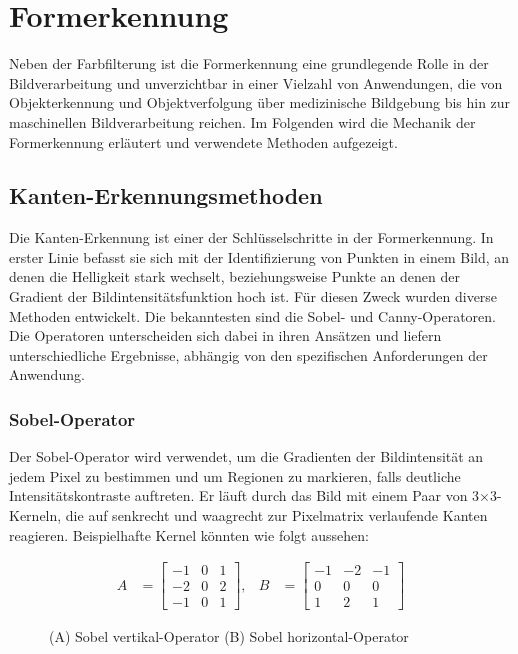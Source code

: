 \section{Formerkennung}
Neben der Farbfilterung ist die Formerkennung eine grundlegende Rolle in der Bildverarbeitung und unverzichtbar in einer Vielzahl von Anwendungen,
die von Objekterkennung und Objektverfolgung über medizinische Bildgebung bis hin zur maschinellen Bildverarbeitung reichen. Im Folgenden wird 
die Mechanik der Formerkennung erläutert und verwendete Methoden aufgezeigt.

\subsection{Kanten-Erkennungsmethoden}
Die Kanten-Erkennung ist einer der Schlüsselschritte in der Formerkennung. In erster Linie befasst sie sich mit der Identifizierung von Punkten in einem Bild,
an denen die Helligkeit stark wechselt, beziehungsweise Punkte an denen der Gradient der  Bildintensitätsfunktion hoch ist. Für diesen Zweck wurden diverse
Methoden entwickelt. Die bekanntesten sind die Sobel- und Canny-Operatoren. Die Operatoren unterscheiden sich dabei in ihren Ansätzen und 
liefern unterschiedliche Ergebnisse, abhängig von den spezifischen Anforderungen der Anwendung.~\cite{AHMED_SHIHAB_AHMED_2018_jatit}

\subsubsection{Sobel-Operator}
Der Sobel-Operator wird verwendet,  um die Gradienten der Bildintensität an jedem Pixel zu bestimmen und 
um Regionen zu markieren, falls deutliche Intensitätskontraste auftreten. Er läuft durch das Bild mit einem Paar von 3$\times$3-Kerneln, 
die auf senkrecht und waagrecht zur Pixelmatrix verlaufende Kanten reagieren. Beispielhafte Kernel könnten wie folgt aussehen:

\begin{figure}[h!]
\centering
\begin{align*}
    A &= \begin{bmatrix}
        -1 & 0 & 1 \\
        -2 & 0 & 2 \\
        -1 & 0 & 1
    \end{bmatrix},
    & B &= \begin{bmatrix}
        -1 & -2 & -1 \\
        0 & 0 & 0 \\
        1 & 2 & 1
    \end{bmatrix}
\end{align*}
\caption{(A) Sobel vertikal-Operator (B) Sobel horizontal-Operator}
\end{figure}

